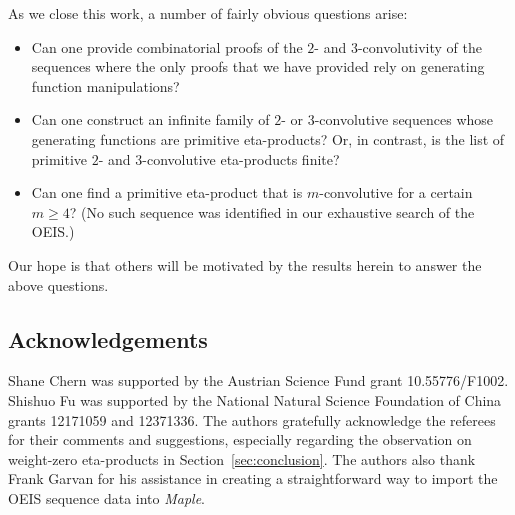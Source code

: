 \documentclass[12pt,reqno]{amsart}
\numberwithin{equation}{section}
\theoremstyle{plain}
\theoremstyle{definition}
\theoremstyle{named}
\begin{document}
As we close this work, a number of fairly obvious questions arise:
\begin{itemize}[itemsep=4pt]
	\item Can one provide combinatorial proofs of the $2$- and $3$-convolutivity of the sequences where the only proofs that we have provided rely on generating function manipulations?  

	\item Can one construct an infinite family of $2$- or $3$-convolutive sequences whose generating functions are primitive eta-products? Or, in contrast, is the list of primitive $2$- and $3$-convolutive eta-products finite?

	\item Can one find a primitive eta-product that is $m$-convolutive for a certain $m\ge 4$? (No such sequence was identified in our exhaustive search of the OEIS.)
\end{itemize}
 Our hope is that others will be motivated by the results herein to answer the above questions.

\subsection*{Acknowledgements}

Shane Chern was supported by the Austrian Science Fund grant 10.55776/F1002. Shishuo Fu was supported by the National Natural Science Foundation of China grants 12171059 and 12371336. The authors gratefully acknowledge the referees for their comments and suggestions, especially regarding the observation on weight-zero eta-products in Section~\ref{sec:conclusion}. The authors also thank Frank Garvan for his assistance in creating a straightforward way to import the OEIS sequence data into \emph{Maple}.
\end{document}
